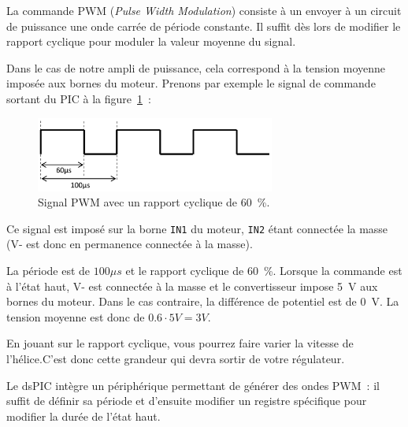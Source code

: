 \documentclass[11pt,a4paper]{article}
\theoremstyle{definition}%
\begin{document}
La commande PWM (\textit{Pulse Width Modulation}) consiste à un envoyer à un circuit de puissance une
onde carrée de période constante.
Il suffit dès lors de modifier le rapport cyclique pour moduler la valeur moyenne du signal.

Dans le cas de notre ampli de puissance, cela correspond à la tension moyenne imposée aux bornes
du moteur.
Prenons par exemple le signal de commande sortant du PIC à la figure~\ref{fig:pwm}~:

\begin{figure}[H]
\center
\includegraphics[width=0.7\textwidth]{pwm}
\caption{Signal PWM avec un rapport cyclique de 60~\%.}
\label{fig:pwm}
\end{figure}

Ce signal est imposé sur la borne \texttt{IN1} du moteur, \texttt{IN2} étant connectée la masse (V- est donc en
permanence connectée à la masse).

La période est de $100 \mu s$ et le rapport cyclique de 60~\%.
Lorsque la commande est à l’état haut, V- est connectée à la masse et le convertisseur impose 5~V aux bornes du moteur.
Dans le cas contraire, la différence de potentiel est de 0~V.
La tension moyenne est donc de $0.6 \cdot 5V  = 3 V$.

\begin{framed}
En jouant sur le rapport cyclique, vous pourrez faire varier la vitesse de l’hélice.\newline{}C'est donc cette
grandeur qui devra sortir de votre régulateur.
\end{framed}

Le dsPIC intègre un périphérique permettant de générer des ondes PWM~: il suffit de définir sa période et d’ensuite modifier un registre spécifique
pour modifier la durée de l’état haut.
\end{document}
